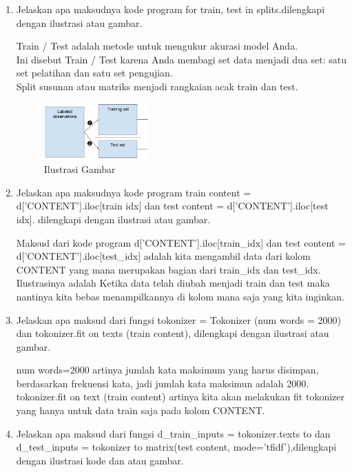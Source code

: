\begin{enumerate}
\item Jelaskan apa maksudnya kode program for train, test in splits.dilengkapi dengan ilustrasi atau gambar.

Train / Test adalah metode untuk mengukur akurasi model Anda.\\
Ini disebut Train / Test karena Anda membagi set data menjadi dua set: satu set pelatihan dan satu set pengujian.\\
Split susunan atau matriks menjadi rangkaian acak train dan test.

\begin{figure}
	\includegraphics[width=4cm]{figures/1174062/7/teori3.png}
	\centering
	\caption{Ilustrasi Gambar}
\end{figure}

\item Jelaskan apa maksudnya kode program train content = d[’CONTENT’].iloc[train idx] dan test content = d[’CONTENT’].iloc[test idx]. dilengkapi dengan ilustrasi atau gambar.

Maksud dari kode program d[’CONTENT’].iloc[train\_idx] dan test content = d[’CONTENT’].iloc[test\_idx] adalah kita mengambil data dari kolom CONTENT yang mana merupakan bagian dari train\_idx dan test\_idx.\\
Ilustrasinya adalah Ketika data telah diubah menjadi train dan test maka nantinya kita bebas menampilkannya di kolom mana saja yang kita inginkan.

\item Jelaskan apa maksud dari fungsi tokonizer = Tokonizer (num words = 2000) dan tokonizer.fit on texts (train content), dilengkapi dengan ilustrasi atau gambar.

num words=2000 artinya jumlah kata maksimum yang harus disimpan, berdasarkan frekuensi kata, jadi jumlah kata maksimun adalah 2000.\\

tokonizer.fit on text (train content) artinya kita akan melakukan fit tokonizer yang hanya untuk data train saja pada kolom CONTENT.

\item Jelaskan apa maksud dari fungsi d\_train\_inputs =  tokonizer.texts to dan d\_test\_inputs = tokonizer to matrix(test content, mode='tfidf'),dilengkapi dengan ilustrasi kode dan atau gambar.


\end{enumerate}
